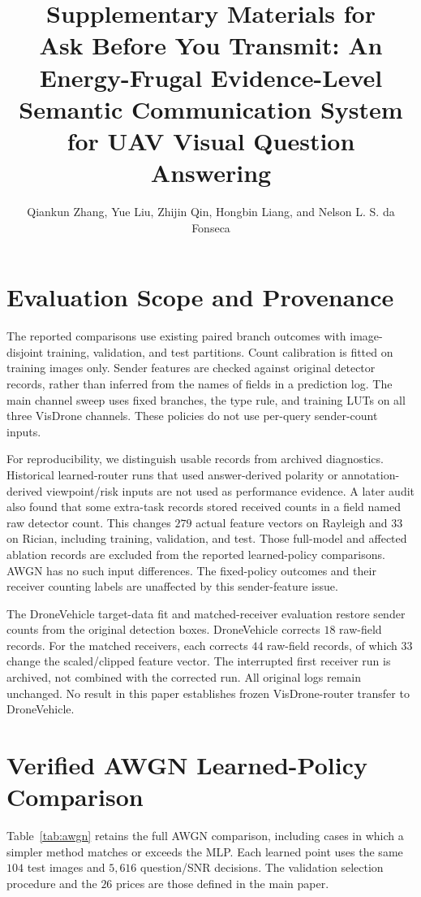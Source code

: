 \documentclass[12pt,lettersize,journal,onecolumn]{IEEEtran}
\begin{document}
\title{Supplementary Materials for\\Ask Before You Transmit:
An Energy-Frugal Evidence-Level Semantic Communication System for UAV
Visual Question Answering}
\author{Qiankun Zhang, Yue Liu, Zhijin Qin, Hongbin Liang, and Nelson L. S. da Fonseca}
\maketitle

\section{Evaluation Scope and Provenance}
The reported comparisons use existing paired branch outcomes with
image-disjoint training, validation, and test partitions. Count
calibration is fitted on training images only. Sender features
are checked against original detector records, rather than inferred
from the names of fields in a prediction log.
The main channel sweep uses fixed branches, the type rule, and
training LUTs on all three VisDrone channels. These policies do
not use per-query sender-count inputs.

For reproducibility, we distinguish usable records from archived
diagnostics. Historical learned-router runs that used answer-derived
polarity or annotation-derived viewpoint/risk inputs are not used
as performance evidence. A later audit also found that some extra-task
records stored received counts in a field named raw detector count.
This changes $279$ actual feature vectors on Rayleigh and $33$ on
Rician, including training, validation, and test. Those full-model
and affected ablation records are excluded from the reported
learned-policy comparisons. AWGN has no such input differences.
The fixed-policy outcomes and their receiver counting labels are
unaffected by this sender-feature issue.

The DroneVehicle target-data fit and matched-receiver evaluation
restore sender counts from the original detection boxes.
DroneVehicle corrects $18$ raw-field records. For the matched
receivers, each corrects $44$ raw-field records, of which $33$
change the scaled/clipped feature vector. The interrupted first
receiver run is archived, not combined with the corrected run.
All original logs remain unchanged. No result in this paper
establishes frozen VisDrone-router transfer to DroneVehicle.

\section{Verified AWGN Learned-Policy Comparison}
Table~\ref{tab:awgn} retains the full AWGN comparison, including
cases in which a simpler method matches or exceeds the MLP.
Each learned point uses the same $104$ test images and $5{,}616$
question/SNR decisions. The validation selection procedure and
the $26$ prices are those defined in the main paper.
\end{document}
